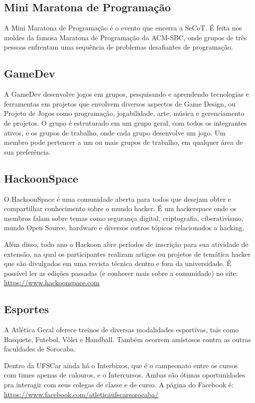 \subsection{Mini Maratona de Programação}
A Mini Maratona de Programação é o evento que encerra a SeCoT. É feita nos moldes da famosa Maratona de Programação da ACM-SBC, onde grupos de três pessoas enfrentam uma sequência de problemas desafiantes de programação.

\subsection{GameDev}
A GameDev desenvolve jogos em grupos, pesquisando e aprendendo tecnologias e ferramentas em projetos que envolvem diversos aspectos de Game Design, ou Projeto de Jogos como programação, jogabilidade, arte, música e gerenciamento de projetos. \newline
O grupo é estruturado em um grupo geral, com todos os integrantes ativos, e os grupos de trabalho, onde cada grupo desenvolve um jogo. Um membro pode pertencer a um ou mais grupos de trabalho, em qualquer área de sua preferência.

\subsection{HackoonSpace}
O HackoonSpace é uma comunidade aberta para todos que desejam obter e compartilhar conhecimento sobre o mundo hacker. É um hackerspace onde os membros falam sobre temas como segurança digital, criptografia, ciberativismo, mundo Open Source, hardware e diversos outros tópicos relacionados a hacking.

Além disso, todo ano o Hackoon abre períodos de inscrição para sua atividade de extensão, na qual os participantes realizam artigos ou projetos de temática hacker que são divulgados em uma revista técnica dentro e fora da universidade. É possível ler as edições passadas (e conhecer mais sobre a comunidade) no site: \url{https://www.hackoonspace.com}

\subsection{Esportes}
A Atlética Geral oferece treinos de diversas modalidades esportivas, tais como Basquete, Futebol, Vôlei e Handball. Também ocorrem amistosos contra as outras faculdades de Sorocaba.

Dentro da UFSCar ainda há o Interbixos, que é o campeonato entre os cursos com times apenas de calouros, e o Intercursos. Ambas são ótimas oportunidades pra interagir com seus colegas de classe e de curso. A página do Facebook é: \url{https://www.facebook.com/atleticaufscarsorocaba/}

